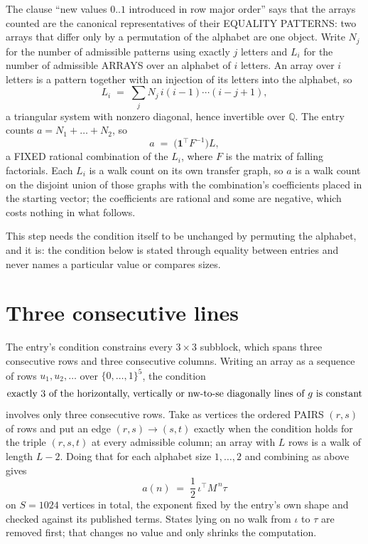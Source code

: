 \documentclass[11pt,a4paper]{article}
\theoremstyle{plain}
\theoremstyle{definition}
\begin{document}
The clause ``new values $0..1$ introduced in row major order'' says that the arrays
counted are the canonical representatives of their EQUALITY PATTERNS: two arrays that differ
only by a permutation of the alphabet are one object. Write $N_j$ for the number of admissible
patterns using exactly $j$ letters and $L_i$ for the number of admissible ARRAYS over an
alphabet of $i$ letters. An array over $i$ letters is a pattern together with an injection of
its letters into the alphabet, so
\[
L_i\;=\;\sum_{j}N_j\,i(i-1)\cdots(i-j+1),
\]
a triangular system with nonzero diagonal, hence invertible over $\mathbb{Q}$. The entry
counts $a=N_1+\dots+N_{2}$, so
\[
a\;=\;\bigl(\mathbf{1}^{\!\top}F^{-1}\bigr)L ,
\]
a FIXED rational combination of the $L_i$, where $F$ is the matrix of falling factorials.
Each $L_i$ is a walk count on its own transfer graph, so $a$ is a walk count on the disjoint
union of those graphs with the combination's coefficients placed in the starting vector; the
coefficients are rational and some are negative, which costs nothing in what follows.

This step needs the condition itself to be unchanged by permuting the alphabet, and it is:
the condition below is stated through equality between entries and never names a particular
value or compares sizes.

\section{Three consecutive lines}

The entry's condition constrains every $3\times3$ subblock, which spans three consecutive
rows and three consecutive columns. Writing an array as a sequence of rows
$u_1,u_2,\dots$ over $\{0,\dots,1\}^{5}$, the condition
\[
\text{exactly }3\text{ of the horizontally, vertically or nw-to-se diagonally lines of }g\text{ \text{is constant}}
\]
involves only three consecutive rows. Take as vertices the ordered PAIRS $(r,s)$ of
rows and put an edge $(r,s)\to(s,t)$ exactly when the condition holds for the triple
$(r,s,t)$ at every admissible column; an array with $L$ rows is a walk of length $L-2$.
Doing that for each alphabet size $1,\dots,2$ and combining as above gives
\[
a(n)\;=\;\frac{1}{2}\,\iota^{\!\top}M^{\,n}\tau
\]
on $S=1024$ vertices in total, the exponent fixed by the entry's own shape and checked against
its published terms. States lying on no walk from $\iota$ to $\tau$ are removed first; that
changes no value and only shrinks the computation.
\end{document}
